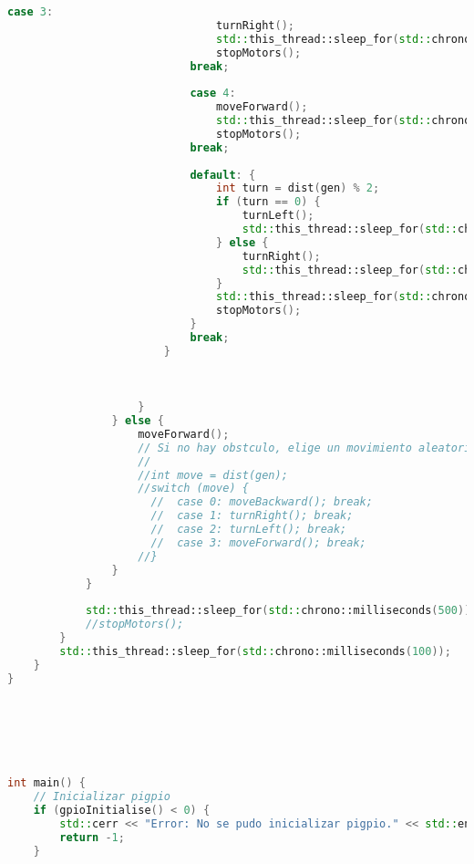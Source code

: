 \begin{lstlisting}[language={C++}, caption={Cuarto ajuste de c\'odigo}, label={CuartoAjuste}]
                            case 3:
                                turnRight();
                                std::this_thread::sleep_for(std::chrono::seconds(7));
                                stopMotors();
                            break;
                            
                            case 4:
                                moveForward();
                                std::this_thread::sleep_for(std::chrono::seconds(2));
                                stopMotors();
                            break;
                            
                            default: {
                                int turn = dist(gen) % 2;
                                if (turn == 0) {
                                    turnLeft();
                                    std::this_thread::sleep_for(std::chrono::seconds(5));
                                } else {
                                    turnRight();
                                    std::this_thread::sleep_for(std::chrono::seconds(5));
                                }
                                std::this_thread::sleep_for(std::chrono::seconds(2));
                                stopMotors();
                            }
                            break;
                        }

                        
                        
                    }
                } else {
                    moveForward();
                    // Si no hay obstculo, elige un movimiento aleatorio
                    //
                    //int move = dist(gen);
                    //switch (move) {
                      //  case 0: moveBackward(); break;
                      //  case 1: turnRight(); break;
                      //  case 2: turnLeft(); break;
                      //  case 3: moveForward(); break;
                    //}
                }
            }
            
            std::this_thread::sleep_for(std::chrono::milliseconds(500));
            //stopMotors();
        }
        std::this_thread::sleep_for(std::chrono::milliseconds(100));
    }
}






int main() {
    // Inicializar pigpio
    if (gpioInitialise() < 0) {
        std::cerr << "Error: No se pudo inicializar pigpio." << std::endl;
        return -1;
    }


\end{lstlisting}
